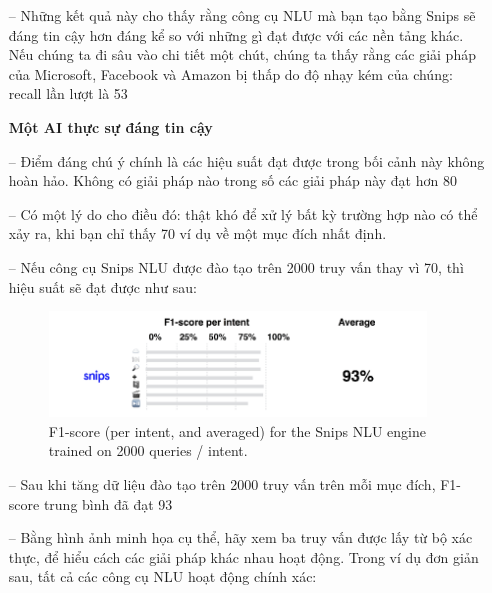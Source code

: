\begin{itemize}
        \item[--]Những kết quả này cho thấy rằng công cụ NLU mà bạn tạo bằng Snips sẽ đáng tin cậy hơn đáng kể so với những gì đạt được với các nền tảng khác. Nếu chúng ta đi sâu vào chi tiết một chút, chúng ta thấy rằng các giải pháp của Microsoft, Facebook và Amazon bị thấp do độ nhạy kém của chúng: recall lần lượt là 53%

        \textbf{Một AI thực sự đáng tin cậy}

        \item[--]Điểm đáng chú ý chính là các hiệu suất đạt được trong bối cảnh này không hoàn hảo. Không có giải pháp nào trong số các giải pháp này đạt hơn 80%

        \item[--]Có một lý do cho điều đó: thật khó để xử lý bất kỳ trường hợp nào có thể xảy ra, khi bạn chỉ thấy 70 ví dụ về một mục đích nhất định.

        \item[--]Nếu công cụ Snips NLU được đào tạo trên 2000 truy vấn thay vì 70, thì hiệu suất sẽ đạt được như sau:

        \begin{figure}[htp]
            \centering
            \includegraphics[width=10cm]{images/ComparisonOfNLU/f1Score2000Intents.png}
            \caption{F1-score (per intent, and averaged) for the Snips NLU engine trained on 2000 queries / intent.}
            \label{fig:system-class-intent}
        \end{figure}


        \item[--]Sau khi tăng dữ liệu đào tạo trên 2000 truy vấn trên mỗi mục đích, F1-score trung bình đã đạt 93%

        \item[--]Bằng hình ảnh minh họa cụ thể, hãy xem ba truy vấn được lấy từ bộ xác thực, để hiểu cách các giải pháp khác nhau hoạt động. Trong ví dụ đơn giản sau, tất cả các công cụ NLU hoạt động chính xác:


\end{itemize}
